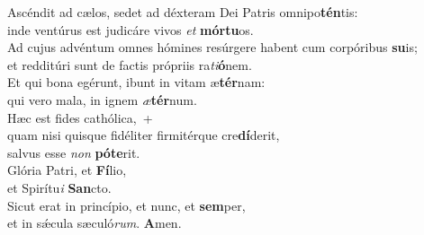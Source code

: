 \oddverse Ascéndit ad cælos, sedet ad déxteram Dei Patris omnipo\textbf{tén}tis:~\*\\
\oddverse inde ventúrus est judicáre vivos \textit{et} \textbf{mór}\textbf{tu}os.\\
\evenverse Ad cujus advéntum omnes hómines resúrgere habent cum corpóribus \textbf{su}is;~\*\\
\evenverse et redditúri sunt de factis própriis ra\textit{ti}\textbf{ó}nem.\\
\oddverse Et qui bona egérunt, ibunt in vitam æ\textbf{tér}nam:~\*\\
\oddverse qui vero mala, in ignem \textit{æ}\textbf{tér}num.\\
\evenverse Hæc est fides cathólica,~+\\
\evenverse  quam nisi quisque fidéliter firmitérque cre\textbf{dí}derit,~\*\\
\evenverse salvus esse \textit{non} \textbf{pó}\textbf{te}rit.\\
\oddverse Glória Patri, et \textbf{Fí}lio,~\*\\
\oddverse et Spirítu\textit{i} \textbf{San}cto.\\
\evenverse Sicut erat in princípio, et nunc, et \textbf{sem}per,~\*\\
\evenverse et in sǽcula sæculó\textit{rum}. \textbf{A}men.\\
